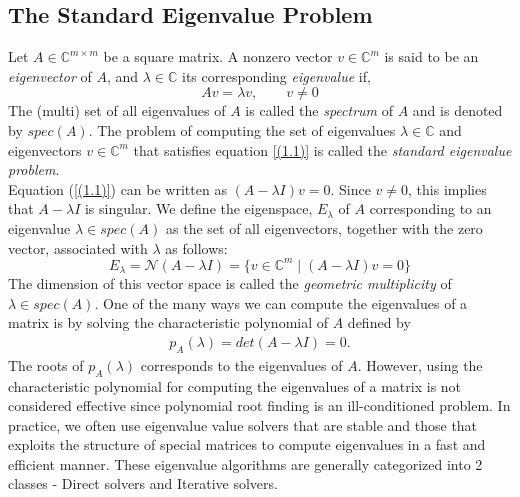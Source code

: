 \subsection{The Standard Eigenvalue Problem}
Let $A \in \mathbb{C}^{m\times m}$ be a square matrix. A nonzero vector $v \in \mathbb{C}^m$ is said to be an \textit{eigenvector} of $A$, and $\lambda \in \mathbb{C}$ its corresponding \textit{eigenvalue} if,
\begin{equation}\label{(1.1)}
	Av = \lambda v, \qquad v \neq 0
\end{equation}
The (multi) set of all eigenvalues of $A$ is called the \textit{spectrum} of $A$ and is denoted by $spec(A)$.
The problem of computing the set of eigenvalues $\lambda \in \mathbb{C}$ and eigenvectors $v \in \mathbb{C}^{m}$ that satisfies equation \ref{(1.1)} is called the \textit{standard eigenvalue problem}. \\
Equation (\ref{(1.1)}) can be written as $(A-\lambda I)v = 0$. Since $v\neq0$, this implies that $A-\lambda I$ is singular. We define the eigenspace, $E_\lambda$ of $A$ corresponding to an eigenvalue $\lambda \in spec(A)$ as the set of all eigenvectors, together with the zero vector, associated with $\lambda$ as follows:
\begin{equation}
	E_\lambda = \mathcal{N}(A-\lambda I) = \{v \in \mathbb{C}^{m} \mid (A - \lambda I)v = 0\}
\end{equation}
The dimension of this vector space is called the \textit{geometric multiplicity} of $\lambda \in spec(A)$.
One of the many ways we can compute the eigenvalues of a matrix is by solving the characteristic polynomial of $A$ defined by
\begin{align*}
	p_A (\lambda) = det(A - \lambda I)  = 0.
\end{align*}
The roots of $p_A (\lambda)$ corresponds to the eigenvalues of $A$. However, using the characteristic polynomial for computing the eigenvalues of a matrix is not considered effective since polynomial root finding is an ill-conditioned problem. In practice, we often use eigenvalue value solvers that are stable and those that exploits the structure of special matrices to compute eigenvalues in a fast and efficient manner. These eigenvalue algorithms are generally categorized into 2 classes - Direct solvers and Iterative solvers.
